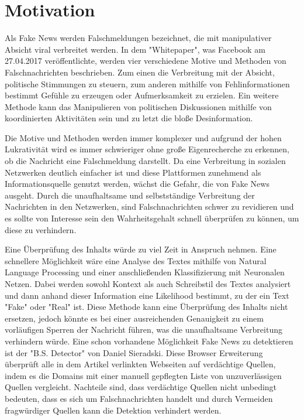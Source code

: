 \chapter{Motivation}
\label{sec:motivation}

Als Fake News werden Falschmeldungen bezeichnet, die mit manipulativer Absicht viral verbreitet werden. In dem 
"Whitepaper"\cite{facebook}, was Facebook am 27.04.2017 veröffentlichte, werden vier verschiedene Motive und  
Methoden von Falschnachrichten beschrieben. 
Zum einen die Verbreitung mit der Absicht, politische Stimmungen 
zu steuern, zum anderen mithilfe von Fehlinformationen bestimmt Gefühle zu erzeugen oder Aufmerksamkeit zu erzielen. 
Ein weitere Methode kann das Manipulieren von politischen Diskussionen mithilfe von koordinierten Aktivitäten sein und 
zu letzt die bloße Desinformation.

Die Motive und Methoden werden immer komplexer und aufgrund der hohen Lukrativität\cite{Cynk} wird es immer schwieriger 
ohne große Eigenrecherche zu erkennen, ob die Nachricht eine Falschmeldung darstellt.
Da eine Verbreitung in sozialen Netzwerken deutlich einfacher ist und diese Plattformen zunehmend als
Informationsquelle genutzt werden\cite{nachrichtenquelle}, wächst die Gefahr, die von Fake News ausgeht.
Durch die unaufhaltsame und selbstständige Verbreitung der Nachrichten in den Netzwerken, sind Falschnachrichten schwer 
zu revidieren und es sollte von Interesse sein den Wahrheitsgehalt schnell überprüfen zu können, um diese
zu verhindern.

Eine Überprüfung des Inhalts würde zu viel Zeit in Anspruch nehmen. Eine schnellere Möglichkeit wäre eine Analyse 
des Textes mithilfe von Natural Language Processing und einer anschließenden Klassifizierung mit Neuronalen Netzen.
Dabei werden sowohl Kontext als auch Schreibstil des Textes analysiert und dann anhand dieser Information eine 
Likelihood bestimmt, zu der ein Text "Fake" oder "Real" ist.
Diese Methode kann eine Überprüfung des Inhalts nicht ersetzen, 
jedoch könnte es bei einer ausreichenden Genauigkeit zu einem vorläufigen Sperren der Nachricht führen, was die 
unaufhaltsame Verbreitung verhindern würde.
Eine schon vorhandene Möglichkeit Fake News zu detektieren ist der "B.S. Detector" von Daniel Sieradski\cite{BS}.
Diese Browser Erweiterung überprüft alle in dem Artikel verlinkten Webseiten auf verdächtige Quellen, indem es die 
Domains mit einer manuell gepflegten Liste von unzuverlässigen Quellen vergleicht. 
Nachteile sind, dass verdächtige Quellen nicht unbedingt bedeuten, dass es sich um 
Falschnachrichten handelt und durch Vermeiden fragwürdiger Quellen kann die Detektion verhindert werden.


